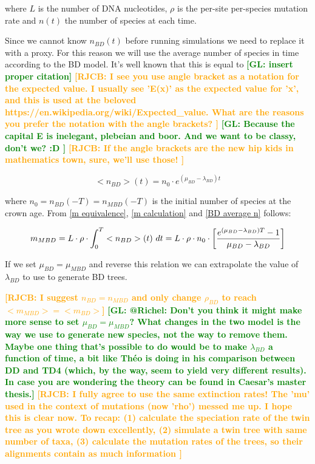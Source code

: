 \documentclass{article}
\newcommand*\richel[1]{\textcolor{orange}{\textbf{[RJCB: #1]}}}
\newcommand*\gio[1]{\textcolor{green}{\textbf{[GL: #1]}}}
\begin{document}
\begin{itemize}
where $L$ is the number of DNA nucleotides, 
$\rho$ is the per-site per-species mutation rate and
$n(t)$ the number of species at each time.

Since we cannot know $n_{BD}(t)$ before running simulations
we need to replace it with a proxy. 
For this reason we will use the average number of
species in time according to the BD model. 
It's well known that this is equal to \gio{insert proper citation}
\richel{
  I see you use angle bracket as a notation for the expected
  value. I usually see 'E(x)' as the expected value for 'x',
  and this is used at the beloved https://en.wikipedia.org/wiki/Expected\_value.
  What are the reasons you prefer the notation with the angle brackets?  
}
\gio{
  Because the capital E is inelegant, plebeian and boor. 
  And we want to be classy, don't we? :D
}
\richel{
  If the angle brackets are the new hip kids in mathematics town, sure,
  we'll use those!
}

\begin{equation}
    <n_{BD}>(t) = n_{0} \cdot e^{(\mu_{BD} - \lambda_{BD})t} \label{BD average n}
\end{equation}

where $n_{0} = n_{BD}(-T) = n_{MBD}(-T)$ is the initial number of species at the crown age.
From \ref{m equivalence}, \ref{m calculation} and \ref{BD average n} follows:

\begin{equation}
m_{MBD} = L \cdot \rho \cdot \int_{0}^{T} <n_{BD}>(t)\ dt \\
= L \cdot \rho \cdot n_{0} \cdot \left[ \frac{e^{(\mu_{BD} - \lambda_{BD})T} - 1}{\mu_{BD} - \lambda_{BD}} \right]
\end{equation}

If we set $\mu_{BD} = \mu_{MBD}$ and reverse this relation we can extrapolate the value of $\lambda_{BD}$ to use to generate BD trees.

\richel{I suggest $n_{BD} = n_{MBD}$ and only 
change $\rho_{BD}$ to reach $<m_{MBD}> = <m_{BD}>$}
\gio{@Richel: Don't you think it might make more sense to set $\mu_{BD} = \mu_{MBD}$? What changes in the two model is the way we use to generate new species, not the way to remove them. Maybe one thing that's possible to do would be to make $\lambda_{BD}$ a function of time, a bit like Théo is doing in his comparison between DD and TD4 (which, by the way, seem to yield very different results). In case you are wondering the theory can be found in Caesar's master thesis.}
\richel{
  I fully agree to use the same extinction rates!
  The 'mu' used in the context of mutations (now 'rho') messed me up.
  I hope this is clear now. To recap: 
  (1) calculate the speciation rate of the twin tree as you wrote down excellently,
  (2) simulate a twin tree with same number of taxa,
  (3) calculate the mutation rates of the trees, 
    so their alignments contain as much information
}


\end{itemize}
\end{document}
